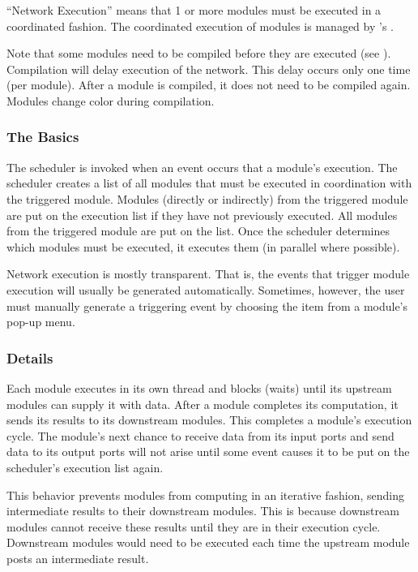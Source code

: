 ``Network Execution'' means that 1 or more modules must be executed in a
coordinated fashion. The coordinated execution of modules is managed by
\sr{}'s .

Note that some modules need to be compiled before they are
executed (see ).  Compilation
will delay execution of the network.  This delay occurs only one time
(per module).  After a module is compiled, it does not need to be
compiled again.  Modules change color during compilation.


\subsubsection{The Basics}

The scheduler is invoked when an event occurs that  a
module's execution.  The scheduler creates a list of all modules that
must be executed in coordination with the triggered module. Modules
 (directly or indirectly) from the triggered module are 
put on the execution list if they have not previously executed.
All modules  from the triggered module are put
on the list.  Once the scheduler determines which modules must be
executed, it executes them (in parallel where possible).

Network execution is mostly transparent.  That is, the events that trigger
module execution will usually be generated automatically. Sometimes, however, the user must manually
generate a triggering event by choosing the  item from a
module's pop-up menu.

\subsubsection{Details}

Each module executes in its own thread and blocks (waits) until its upstream
modules can supply it with data.  After a module completes its computation,
it sends its results to its downstream modules.  This completes a module's
execution cycle.  The module's next chance to receive data from its input ports
and send data to its output ports will not arise until some event
causes it to be put on the scheduler's execution list again.  

This behavior prevents modules from computing in an iterative fashion,
sending intermediate results to their downstream modules.  This is because
downstream modules cannot receive these results until they are in their
execution cycle.   Downstream modules would need to be executed each time the
upstream module posts an intermediate result.



